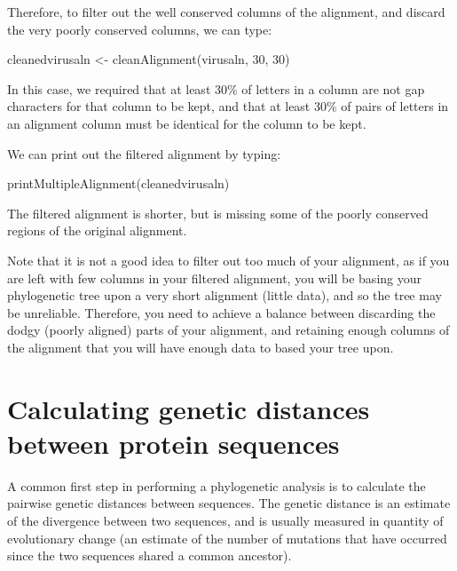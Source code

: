 \documentclass[
]{book}
\newenvironment{Shaded}{\begin{snugshade}}{\end{snugshade}}
\newcommand{\DecValTok}[1]{\textcolor[rgb]{0.00,0.00,0.81}{#1}}
\newcommand{\FunctionTok}[1]{\textcolor[rgb]{0.00,0.00,0.00}{#1}}
\newcommand{\NormalTok}[1]{#1}
\newcommand{\OtherTok}[1]{\textcolor[rgb]{0.56,0.35,0.01}{#1}}
\begin{document}
Therefore, to filter out the well conserved columns of the alignment, and discard the very poorly conserved columns, we can type:

\begin{Shaded}
\begin{Highlighting}[]
\NormalTok{cleanedvirusaln }\OtherTok{\textless{}{-}} \FunctionTok{cleanAlignment}\NormalTok{(virusaln, }\DecValTok{30}\NormalTok{, }\DecValTok{30}\NormalTok{)}
\end{Highlighting}
\end{Shaded}

In this case, we required that at least 30\% of letters in a column are not gap characters for that column to be kept, and that at least 30\% of pairs of letters in an alignment column must be identical for the column to be kept.

We can print out the filtered alignment by typing:

\begin{Shaded}
\begin{Highlighting}[]
\FunctionTok{printMultipleAlignment}\NormalTok{(cleanedvirusaln)}
\end{Highlighting}
\end{Shaded}

The filtered alignment is shorter, but is missing some of the poorly conserved regions of the original alignment.

Note that it is not a good idea to filter out too much of your alignment, as if you are left with few columns in your filtered alignment, you will be basing your phylogenetic tree upon a very short alignment (little data), and so the tree may be unreliable. Therefore, you need to achieve a balance between discarding the dodgy (poorly aligned) parts of your alignment, and retaining enough columns of the alignment that you will have enough data to based your tree upon.

\hypertarget{calculating-genetic-distances-between-protein-sequences}{%
\section{Calculating genetic distances between protein sequences}\label{calculating-genetic-distances-between-protein-sequences}}

A common first step in performing a phylogenetic analysis is to calculate the pairwise genetic distances between sequences. The genetic distance is an estimate of the divergence between two sequences, and is usually measured in quantity of evolutionary change (an estimate of the number of mutations that have occurred since the two sequences shared a common ancestor).
\end{document}
